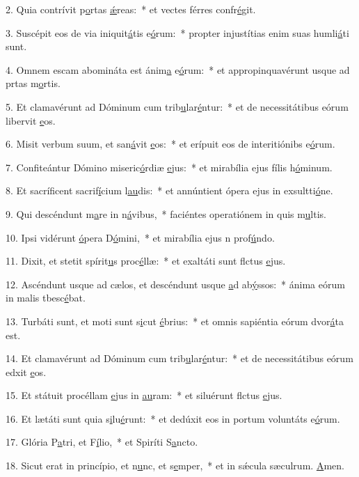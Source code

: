 2. Quia contrívit p\uline{o}rtas \uline{ǽ}reas:~* et vectes férres confr\uline{é}git.\par 
3. Suscépit eos de via iniquit\uline{á}tis e\uline{ó}rum:~* propter injustítias enim suas humli\uline{á}ti sunt.\par 
4. Omnem escam abomináta est ánim\uline{a} e\uline{ó}rum:~* et appropinquavérunt usque ad prtas m\uline{o}rtis.\par 
5. Et clamavérunt ad Dóminum cum trib\uline{u}lar\uline{é}ntur:~* et de necessitátibus eórum libervit \uline{e}os.\par 
6. Misit verbum suum, et san\uline{á}vit \uline{e}os:~* et erípuit eos de interitiónibs e\uline{ó}rum.\par 
7. Confiteántur Dómino miseric\uline{ó}rdiæ \uline{e}jus:~* et mirabília ejus fílis h\uline{ó}minum.\par 
8. Et sacríficent sacrif\uline{í}cium l\uline{au}dis:~* et annúntient ópera ejus in exsultti\uline{ó}ne.\par 
9. Qui descéndunt m\uline{a}re in n\uline{á}vibus,~* faciéntes operatiónem in quis m\uline{u}ltis.\par 
10. Ipsi vidérunt \uline{ó}pera D\uline{ó}mini,~* et mirabília ejus n prof\uline{ú}ndo.\par 
11. Dixit, et stetit spírit\uline{u}s proc\uline{é}llæ:~* et exaltáti sunt flctus \uline{e}jus.\par 
12. Ascéndunt usque ad cælos, et descéndunt usque \uline{a}d ab\uline{ý}ssos:~* ánima eórum in malis tbesc\uline{é}bat.\par 
13. Turbáti sunt, et moti sunt s\uline{i}cut \uline{é}brius:~* et omnis sapiéntia eórum dvor\uline{á}ta est.\par 
14. Et clamavérunt ad Dóminum cum trib\uline{u}lar\uline{é}ntur:~* et de necessitátibus eórum edxit \uline{e}os.\par 
15. Et státuit procéllam \uline{e}jus in \uline{au}ram:~* et siluérunt flctus \uline{e}jus.\par 
16. Et lætáti sunt quia s\uline{i}lu\uline{é}runt:~* et dedúxit eos in portum voluntáts e\uline{ó}rum.\par 
17. Glória P\uline{a}tri, et F\uline{í}lio,~* et Spiríti S\uline{a}ncto.\par 
18. Sicut erat in princípio, et n\uline{u}nc, et s\uline{e}mper,~* et in sǽcula sæculrum. \uline{A}men.\par 
